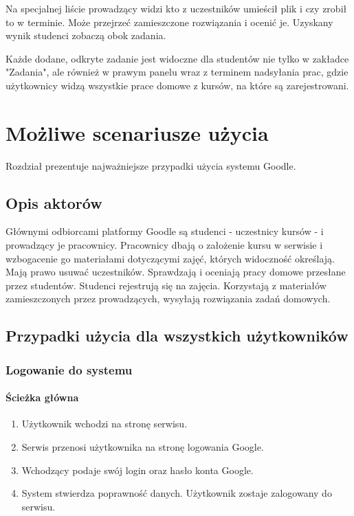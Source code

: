 \documentclass{pracamgr}
\begin{document}
Na specjalnej liście prowadzący widzi kto z uczestników umieścił plik
i czy zrobił to w terminie. Może przejrzeć zamieszczone rozwiązania 
i ocenić je. Uzyskany wynik studenci zobaczą obok zadania.

Każde dodane, odkryte zadanie jest widoczne dla studentów nie tylko w zakładce
"Zadania", ale również w prawym panelu wraz z terminem nadsyłania prac, 
gdzie użytkownicy widzą wszystkie prace domowe z kursów, na które są
zarejestrowani.

%
%
\chapter{Możliwe scenariusze użycia}

Rozdział prezentuje najważniejsze przypadki użycia systemu Goodle. 

\section{Opis aktorów}

Głównymi odbiorcami platformy Goodle są studenci - uczestnicy kursów - i 
prowadzący je pracownicy. Pracownicy dbają o założenie kursu w serwisie i 
wzbogacenie go materiałami dotyczącymi zajęć, których widoczność określają. 
Mają prawo usuwać uczestników. Sprawdzają i oceniają pracy domowe przesłane 
przez studentów. Studenci rejestrują się na zajęcia. Korzystają z materiałów 
zamieszczonych przez prowadzących, wysyłają rozwiązania zadań domowych.

\section {Przypadki użycia dla wszystkich użytkowników}

\subsection{Logowanie do systemu}

\subsubsection{Ścieżka główna}

\begin{enumerate}
   \item Użytkownik wchodzi na stronę serwisu.
   \item Serwis przenosi użytkownika na stronę logowania Google.
   \item Wchodzący podaje swój login oraz hasło konta Google.
   \item System stwierdza poprawność danych.
   \iem Użytkownik zostaje zalogowany do serwisu.
\end{enumerate}
\end{document}
